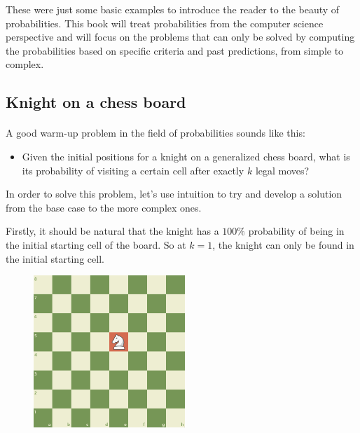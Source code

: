 \documentclass[letterpaper]{article}
\begin{document}
These were just some basic examples to introduce the reader to the beauty of probabilities. This book will treat probabilities from the computer science perspective and will focus on the problems that can only be solved by computing the probabilities based on specific criteria and past predictions, from simple to complex.

\newpage

\subsection{Knight on a chess board}

\paragraph{}

A good warm-up problem in the field of probabilities sounds like this:

\begin{itemize}
    \item Given the initial positions for a knight on a generalized chess board, what is its probability of visiting a certain cell after exactly $k$ legal moves?
\end{itemize}

In order to solve this problem, let's use intuition to try and develop a solution from the base case to the more complex ones.

Firstly, it should be natural that the knight has a $100\%$ probability of being in the initial starting cell of the board. So at $k = 1$, the knight can only be found in the initial starting cell.

\begin{figure} [h!]
\centering
\includegraphics[width=0.51\textwidth]{pngOfDiagrams/knightone.png}
\end{figure}
\end{document}
